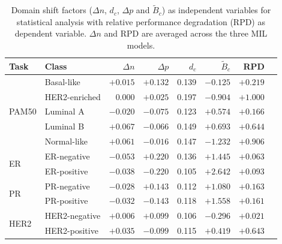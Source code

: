 \begin{table}[ht]
\centering
\caption{Domain shift factors ($\Delta n$, $d_c$, $\Delta p$ and $\tilde{B}_c$) as independent variables for statistical analysis with relative performance degradation (RPD) as dependent variable. $\Delta n$ and RPD are averaged across the three MIL models.}
\label{tab:multivariate-factors}
\begin{tabular}{llrrrrrr}
\toprule
\textbf{Task} & \textbf{Class} & $\Delta n$ & $\Delta p$ & $d_c$ & $\tilde{B}_c$ & \textbf{RPD} \\
\midrule
  \multirow{5}{*}{PAM50} & Basal-like & $+0.015$ & $+0.132$ & 0.139 & $-0.125$ & $+0.219$ \\
    & HER2-enriched & $0.000$ & $+0.025$ & 0.197 & $-0.904$ & $+1.000$ \\
    & Luminal A & $-0.020$ & $-0.075$ & 0.123 & $+0.574$ & $+0.166$ \\
    & Luminal B & $+0.067$ & $-0.066$ & 0.149 & $+0.693$ & $+0.644$ \\
    & Normal-like & $+0.061$ & $-0.016$ & 0.147 & $-1.232$ & $+0.906$ \\
\midrule
  \multirow{2}{*}{ER} & ER-negative & $-0.053$ & $+0.220$ & 0.136 & $+1.445$ & $+0.063$ \\
    & ER-positive & $-0.038$ & $-0.220$ & 0.105 & $+2.642$ & $+0.093$ \\
\midrule
  \multirow{2}{*}{PR} & PR-negative & $-0.028$ & $+0.143$ & 0.112 & $+1.080$ & $+0.163$ \\
    & PR-positive & $-0.032$ & $-0.143$ & 0.118 & $+1.558$ & $+0.161$ \\
\midrule
  \multirow{2}{*}{HER2} & HER2-negative & $+0.006$ & $+0.099$ & 0.106 & $-0.296$ & $+0.021$ \\
    & HER2-positive & $+0.035$ & $-0.099$ & 0.115 & $+0.419$ & $+0.643$ \\
\bottomrule
\end{tabular}
\end{table}